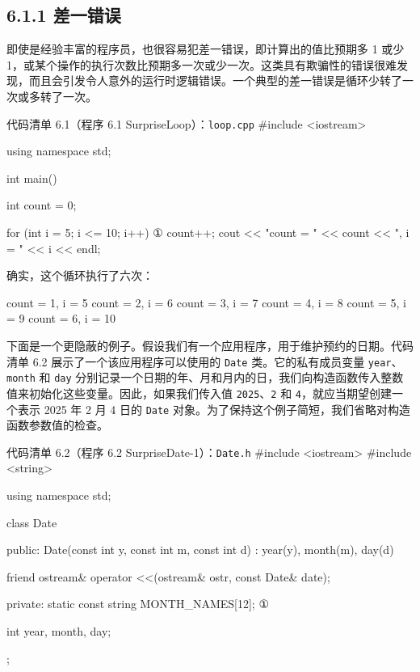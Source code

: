 
\subsection{6.1.1 差一错误}

即使是经验丰富的程序员，也很容易犯差一错误，即计算出的值比预期多 1 或少 1，或某个操作的执行次数比预期多一次或少一次。这类具有欺骗性的错误很难发现，而且会引发令人意外的运行时逻辑错误。一个典型的差一错误是循环少转了一次或多转了一次。

\begin{codeboxt}{代码清单 6.1（程序 6.1 SurpriseLoop）：\texttt{loop.cpp}}
#include <iostream>

using namespace std;

int main()
{
    int count = 0;

    for (int i = 5; i <= 10; i++)  ①
    {
        count++;
        cout << "count = " << count << ", i = " << i << endl;
    }
}
\end{codeboxt}
\par

确实，这个循环执行了六次：

\begin{codebox}
count = 1, i = 5
count = 2, i = 6
count = 3, i = 7
count = 4, i = 8
count = 5, i = 9
count = 6, i = 10
\end{codebox}


下面是一个更隐蔽的例子。假设我们有一个应用程序，用于维护预约的日期。代码清单 6.2 展示了一个该应用程序可以使用的 \texttt{Date} 类。它的私有成员变量 \texttt{year}、\texttt{month} 和 \texttt{day} 分别记录一个日期的年、月和月内的日，我们向构造函数传入整数值来初始化这些变量。因此，如果我们传入值 \texttt{2025}、\texttt{2} 和 \texttt{4}，就应当期望创建一个表示 2025 年 2 月 4 日的 \texttt{Date} 对象。为了保持这个例子简短，我们省略对构造函数参数值的检查。

\begin{codeboxt}{代码清单 6.2（程序 6.2 SurpriseDate-1）：\texttt{Date.h}}
#include <iostream>
#include <string>

using namespace std;

class Date
{
public:
    Date(const int y, const int m, const int d)
        : year(y), month(m), day(d) {}

    friend ostream& operator <<(ostream& ostr, const Date& date);

private:
    static const string MONTH_NAMES[12];     ①

    int year, month, day;
};
\end{codeboxt}
\par

